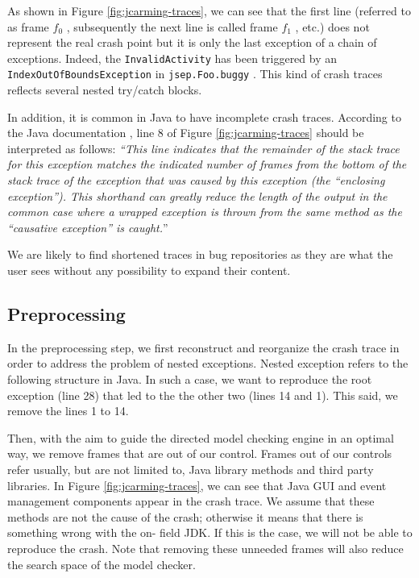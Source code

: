\documentclass[times]{smrauth}
\begin{document}
As shown in Figure \ref{fig:jcarming-traces}, we can see that the first line (referred to
as frame {\it $f_0$} , subsequently the next line is called frame {\it $f_1$} , etc.)
does not represent the real crash point but it is only the last
exception of a chain of exceptions. Indeed, the {\tt InvalidActivity}
has been triggered by an {\tt IndexOutOfBoundsException} in
{\tt jsep.Foo.buggy} . This kind of crash traces reflects several
nested try/catch blocks.

In addition, it is common in Java to have incomplete crash
traces. According to the Java documentation \cite{Oracle2011}, line 8 of
Figure \ref{fig:jcarming-traces} should be interpreted as follows: {\it ``This line indicates
that the remainder of the stack trace for this exception
matches the indicated number of frames from the bottom of the
stack trace of the exception that was caused by this exception
(the ``enclosing exception''). This shorthand can greatly
reduce the length of the output in the common case where a
wrapped exception is thrown from the same method as the
``causative exception'' is caught.}''

We are likely to find shortened traces in bug repositories as
they are what the user sees without any possibility to expand
their content.

\subsection{Preprocessing}

In the preprocessing step, we first reconstruct and reorganize
the crash trace in order to address the problem of nested
exceptions. Nested exception refers to the following structure in Java. In such a case, we want to reproduce the root exception (line 28) 
that led to the the other two (lines 14 and 1). This said, we remove the lines
1 to 14. \\

\noindent{}

\vspace*{0.3cm}

Then, with the aim to guide the directed model checking engine in an optimal way, we remove frames
that are out of our control. Frames out of our controls refer
usually, but are not limited to, Java library methods and third
party libraries. In Figure \ref{fig:jcarming-traces}, we can see that Java GUI and
event management components appear in the crash trace. We
assume that these methods are not the cause of the crash;
otherwise it means that there is something wrong with the on-
field JDK. If this is the case, we will not be able to reproduce
the crash. Note that removing these unneeded frames will also
reduce the search space of the model checker.
\end{document}
